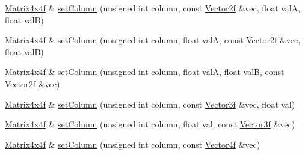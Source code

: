 \begin{DoxyCompactItemize}
\item 
\hyperlink{classh2_1_1_matrix4x4f}{Matrix4x4f} \& \hyperlink{classh2_1_1_matrix4x4f_a5e79e00e570eaaf8f203a7baae3fe3f5}{set\-Column} (unsigned int column, const \hyperlink{classh2_1_1_vector2f}{Vector2f} \&vec, float val\-A, float val\-B)
\item 
\hyperlink{classh2_1_1_matrix4x4f}{Matrix4x4f} \& \hyperlink{classh2_1_1_matrix4x4f_ad87ce6c16fb46f06c4b67849e8dd5e3f}{set\-Column} (unsigned int column, float val\-A, const \hyperlink{classh2_1_1_vector2f}{Vector2f} \&vec, float val\-B)
\item 
\hyperlink{classh2_1_1_matrix4x4f}{Matrix4x4f} \& \hyperlink{classh2_1_1_matrix4x4f_a8bb7d20f3eb5ba9dfcae8dac91c4aaa6}{set\-Column} (unsigned int column, float val\-A, float val\-B, const \hyperlink{classh2_1_1_vector2f}{Vector2f} \&vec)
\item 
\hyperlink{classh2_1_1_matrix4x4f}{Matrix4x4f} \& \hyperlink{classh2_1_1_matrix4x4f_a4d43d756004a63608fda47c4b5ba15af}{set\-Column} (unsigned int column, const \hyperlink{classh2_1_1_vector3f}{Vector3f} \&vec, float val)
\item 
\hyperlink{classh2_1_1_matrix4x4f}{Matrix4x4f} \& \hyperlink{classh2_1_1_matrix4x4f_aa8ff6c6b65c53a11580bef6104ef4ddb}{set\-Column} (unsigned int column, float val, const \hyperlink{classh2_1_1_vector3f}{Vector3f} \&vec)
\item 
\hyperlink{classh2_1_1_matrix4x4f}{Matrix4x4f} \& \hyperlink{classh2_1_1_matrix4x4f_a105827873c65ac74f3d2f7ea9a8ee8df}{set\-Column} (unsigned int column, const \hyperlink{classh2_1_1_vector4f}{Vector4f} \&vec)
\end{DoxyCompactItemize}
